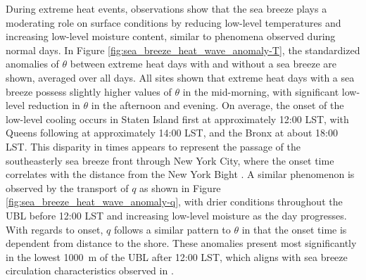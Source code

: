 \documentclass[11pt,a4paper]{article}
\begin{document}
During extreme heat events, observations show that the sea breeze plays a moderating role on surface conditions by reducing low-level temperatures and increasing low-level moisture content, similar to phenomena observed during normal days. In Figure \ref{fig:sea_breeze_heat_wave_anomaly-T}, the standardized anomalies of $\theta$ between extreme heat days with and without a sea breeze are shown, averaged over all days. All sites shown that extreme heat days with a sea breeze possess slightly higher values of $\theta$ in the mid-morning, with significant low-level reduction in $\theta$ in the afternoon and evening. On average, the onset of the low-level cooling occurs in Staten Island first at approximately 12:00 LST, with Queens following at approximately 14:00 LST, and the Bronx at about 18:00 LST. This disparity in times appears to represent the passage of the southeasterly sea breeze front through New York City, where the onset time correlates with the distance from the New York Bight \citep{bornstein1981}. A similar phenomenon is observed by the transport of $q$ as shown in Figure \ref{fig:sea_breeze_heat_wave_anomaly-q}, with drier conditions throughout the UBL before 12:00 LST and increasing low-level moisture as the day progresses. With regards to onset, $q$ follows a similar pattern to $\theta$ in that the onset time is dependent from distance to the shore. These anomalies present most significantly in the lowest \SI{1000}{\meter} of the UBL after 12:00 LST, which aligns with sea breeze circulation characteristics observed in \citet{frizzola1963}.
\end{document}
